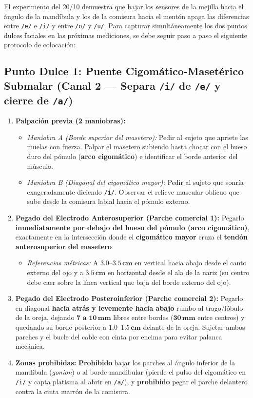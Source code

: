 \documentclass[11pt, a4paper]{article}
\begin{document}
El experimento del 20/10 demuestra que bajar los sensores de la mejilla hacia el ángulo de la mandíbula y los de la comisura hacia el mentón apaga las diferencias entre \texttt{/e/} e \texttt{/i/} y entre \texttt{/o/} y \texttt{/u/}. Para capturar simultáneamente los dos puntos dulces faciales en las próximas mediciones, se debe seguir paso a paso el siguiente protocolo de colocación:

\subsection{Punto Dulce 1: Puente Cigomático-Masetérico Submalar (Canal 2 --- Separa \texttt{/i/} de \texttt{/e/} y cierre de \texttt{/a/})}
\begin{enumerate}\setlength{\itemsep}{2pt}
    \item \textbf{Palpación previa (2 maniobras):}
    \begin{itemize}\setlength{\itemsep}{1pt}
        \item \textit{Maniobra A (Borde superior del masetero):} Pedir al sujeto que apriete las muelas con fuerza. Palpar el masetero subiendo hasta chocar con el hueso duro del pómulo (\textbf{arco cigomático}) e identificar el borde anterior del músculo.
        \item \textit{Maniobra B (Diagonal del cigomático mayor):} Pedir al sujeto que sonría exageradamente diciendo \texttt{/i/}. Observar el relieve muscular oblicuo que sube desde la comisura labial hacia el pómulo externo.
    \end{itemize}
    \item \textbf{Pegado del Electrodo Anterosuperior (Parche comercial 1):}
    Pegarlo \textbf{inmediatamente por debajo del hueso del pómulo (arco cigomático)}, exactamente en la intersección donde el \textbf{cigomático mayor} cruza el \textbf{tendón anterosuperior del masetero}.
    \begin{itemize}\setlength{\itemsep}{1pt}
        \item \textit{Referencias métricas:} A $\mathbf{3.0\text{--}3.5\,\text{cm}}$ en vertical hacia abajo desde el canto externo del ojo y a $\mathbf{3.5\,\text{cm}}$ en horizontal desde el ala de la nariz (su centro debe caer sobre la línea vertical que baja del borde externo del ojo).
    \end{itemize}
    \item \textbf{Pegado del Electrodo Posteroinferior (Parche comercial 2):}
    Pegarlo en diagonal \textbf{hacia atrás y levemente hacia abajo} rumbo al trago/lóbulo de la oreja, dejando $\mathbf{7\text{ a }10\,\text{mm}}$ libres entre bordes ($\mathbf{30\,\text{mm}}$ entre centros) y quedando su borde posterior a $\mathbf{1.0\text{--}1.5\,\text{cm}}$ delante de la oreja. Sujetar ambos parches y el bucle del cable con cinta por encima para evitar palanca mecánica.
    \item \textbf{Zonas prohibidas:} \textbf{Prohibido} bajar los parches al ángulo inferior de la mandíbula (\textit{gonion}) o al borde mandibular (pierde el pulso del cigomático en \texttt{/i/} y capta platisma al abrir en \texttt{/a/}), y \textbf{prohibido} pegar el parche delantero contra la cinta marrón de la comisura.
\end{enumerate}
\end{document}
